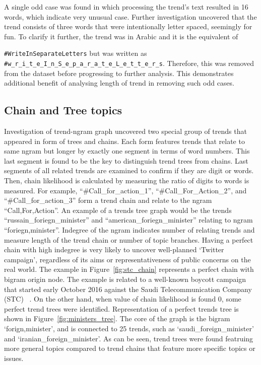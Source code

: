 \documentclass[conference]{IEEEtran}
\begin{document}
A single odd case was found in which processing the trend’s text
resulted in 16 words, which indicate very unusual case. Further
investigation uncovered that the trend consists of three words that
were intentionally letter spaced, seemingly for fun. To clarify it
further, the trend was in Arabic and it is the equivalent of
{\texttt{\#WriteInSeparateLetters} but was written as
{\footnotesize{{\texttt{\#w\_r\_i\_t\_e\_I\_n\_S\_e\_p\_a\_r\_a\_t\_e\_L\_e\_t\_t\_e\_r\_s}}}}.
Therefore, this was removed from the dataset before progressing to
further analysis. This demonstrates additional benefit of analysing
length of trend in removing such odd cases.

\subsection{Chain and Tree topics}

Investigation of trend-ngram graph uncovered two special group of trends 
that appeared in form of trees and chains. 
Each form features trends that relate to same ngram but longer by exactly 
one segment in terms of word numbers. This last segment is found to be 
the key to distinguish trend trees from chains. Last segments of all related 
trends are examined to confirm if they are digit or words. Then, chain 
likelihood is calculated by measuring the ratio of digits to words is measured. 
For example, “\#Call\_for\_action\_1”, “\#Call\_For\_Action\_2”, and 
“\#Call\_for\_action\_3” 
form a trend chain and relate to the ngram “Call,For,Action”. An example 
of a trends tree graph would be the trends “russain\_foriegn\_minister” and 
“american\_foriegn\_minister” relating to ngram “foriegn,minister”. Indegree of 
the ngram indicates number of relating trends and measure length of the 
trend chain or number of topic branches. Having a perfect chain with high indegree 
is very likely to uncover well-planned ‘Twitter campaign’, regardless 
of its aims or representativeness of public concerns on the real world.
The example in Figure~\ref{fig:stc_chain} represents a perfect chain with bigram 
origin node. The example is related to a well-known boycott campaign that 
started early October 2016 against the Saudi Telecommunication Company (STC) ~\cite{naffee-2016}.
On the other hand, when value of chain 
likelihood is found 0, some perfect trend trees were identified. 
Representation of a perfect trends tree is shown in Figure~\ref{fig:ministers_tree}. 
The core of the graph is the bigram ‘forign,minister’, and is connected to 25 
trends, such as ‘saudi\_foreign\_minister’ and ‘iranian\_foreign\_minister’. As can be seen, 
trend trees were found featruing more general topics compared to trend 
chains that feature more specific topics or issues.

}
\end{document}
